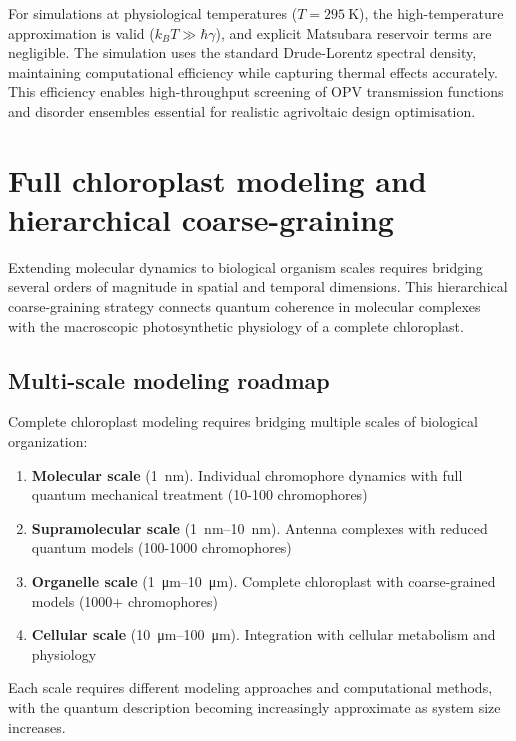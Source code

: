 \documentclass[11pt,a4paper]{article}
\begin{document}
For simulations at physiological temperatures ($T = \SI{295}{\kelvin}$), the high-temperature approximation is valid ($k_B T \gg \hbar\gamma$), and explicit Matsubara reservoir terms are negligible. The simulation uses the standard Drude-Lorentz spectral density, maintaining computational efficiency while capturing thermal effects accurately. This efficiency enables high-throughput screening of OPV transmission functions and disorder ensembles essential for realistic agrivoltaic design optimisation.

\section{Full chloroplast modeling and hierarchical coarse-graining}\label{si:chloroplast_modeling}

Extending molecular dynamics to biological organism scales requires bridging several orders of magnitude in spatial and temporal dimensions. This hierarchical coarse-graining strategy connects quantum coherence in molecular complexes with the macroscopic photosynthetic physiology of a complete chloroplast.

\subsection{Multi-scale modeling roadmap}

Complete chloroplast modeling requires bridging multiple scales of biological organization:
\begin{enumerate}
    \item \textbf{Molecular scale} (\SI{1}{\nano\metre}). Individual chromophore dynamics with full quantum mechanical treatment (10-100 chromophores)
    \item \textbf{Supramolecular scale} (\SIrange{1}{10}{\nano\metre}). Antenna complexes with reduced quantum models (100-1000 chromophores)
    \item \textbf{Organelle scale} (\SIrange{1}{10}{\micro\metre}). Complete chloroplast with coarse-grained models (1000+ chromophores)
    \item \textbf{Cellular scale} (\SIrange{10}{100}{\micro\metre}). Integration with cellular metabolism and physiology
\end{enumerate}
Each scale requires different modeling approaches and computational methods, with the quantum description becoming increasingly approximate as system size increases.
\end{document}
